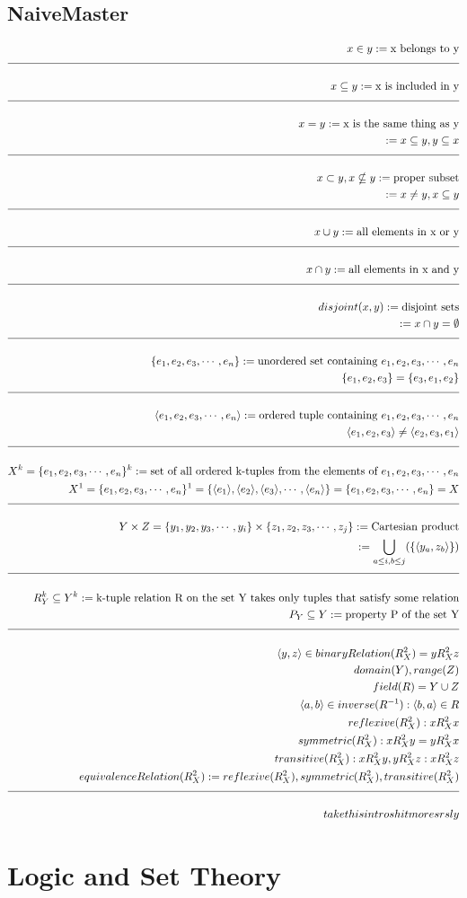 \documentclass[a4paper]{article}
\newcommand{\uset}[1]{\{#1\}}
\newcommand{\otup}[1]{\langle#1\rangle}
\newcommand{\enlist}[2]{{#1}_{1}, {#1}_{2}, {#1}_{3}, \cdots, {#1}_{#2}}
\newcommand{\n}{\\[1.5ex] \hline \nonumber \\[0ex]}
\newcommand{\m}{\nonumber \\}
\begin{document}
\subsection{NaiveMaster}
\begin{tcolorbox}
\begin{align}
   x \in y := \text{x belongs to y}
\n x \subseteq y := \text{x is included in y}
\n x = y := \text{x is the same thing as y}
\m := x \subseteq y, y \subseteq x
\n x \subset y, x \nsubseteq y := \text{proper subset}
\m := x \neq y, x \subseteq y
\n x \cup y := \text{all elements in x or y}
\n x \cap y := \text{all elements in x and y}
\n disjoint(x, y) := \text{disjoint sets}
\m := x \cap y = \emptyset
\n \uset{\enlist{e}{n}} := \text{unordered set containing $\enlist{e}{n}$}
\m \uset{e_1, e_2, e_3} = \uset{e_3, e_1, e_2}
\n \otup{\enlist{e}{n}} := \text{ordered tuple containing $\enlist{e}{n}$}
\m \otup{e_1, e_2, e_3} \neq \otup{e_2, e_3, e_1}
\n X^k = \uset{\enlist{e}{n}}^k := \text{set of all ordered k-tuples from the elements of $\enlist{e}{n}$}
\m X^1 = \uset{\enlist{e}{n}}^1 = \uset{\otup{e_1}, \otup{e_2}, \otup{e_3}, \cdots, \otup{e_n}} = \uset{\enlist{e}{n}} = X
\n Y \times Z = \uset{\enlist{y}{i}} \times \uset{\enlist{z}{j}} := \text{Cartesian product}
\m := \bigcup_{a \leq i, b \leq j} (\uset{\otup{y_a, z_b}})
\n R^k_Y \subseteq Y^k := \text{k-tuple relation R on the set Y takes only tuples that satisfy some relation}
\m P_Y \subseteq Y := \text{property P of the set Y}
\n \otup{y, z} \in binaryRelation(R^2_X) = y R^2_X z
\m domain(Y), range(Z)
\m field(R) = Y \cup Z
\m \otup{a, b} \in inverse(R^{-1}) : \otup{b, a} \in R 
\m reflexive(R^2_X) : x R^2_X x
\m symmetric(R^2_X) : x R^2_X y = y R^2_X x
\m transitive(R^2_X) : x R^2_X y, y R^2_X z : x R^2_X z
\m equivalenceRelation(R^2_X) := reflexive(R^2_X), symmetric(R^2_X), transitive(R^2_X)
\n take this intro shit more srsly 
\end{align}
\end{tcolorbox}

\section{Logic and Set Theory}
\end{document}
